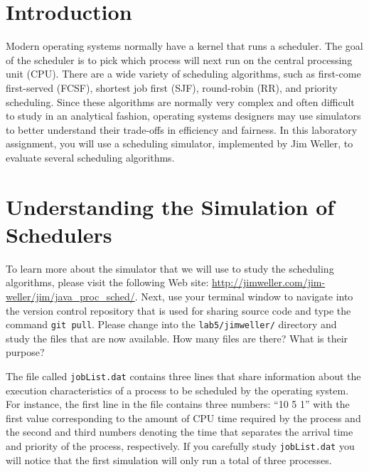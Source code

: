 


\usepackage[compact]{titlesec}


\section*{Introduction}

  Modern operating systems normally have a kernel that runs a scheduler.  The goal of the scheduler is to pick which
  process will next run on the central processing unit (CPU).  There are a wide variety of scheduling algorithms, such
  as first-come first-served (FCSF), shortest job first (SJF), round-robin (RR), and priority scheduling.  Since these
  algorithms are normally very complex and often difficult to study in an analytical fashion, operating systems
  designers may use simulators to better understand their trade-offs in efficiency and fairness. In this laboratory
  assignment, you will use a scheduling simulator, implemented by Jim Weller, to evaluate several scheduling algorithms.

\section*{Understanding the Simulation of Schedulers}

  To learn more about the simulator that we will use to study the scheduling algorithms, please visit the following Web
  site: \url{http://jimweller.com/jim-weller/jim/java_proc_sched/}. Next, use your terminal window to navigate into the
  version control repository that is used for sharing source code and type the command {\tt git pull}.  Please change
  into the {\tt lab5/jimweller/} directory and study the files that are now available. How many files are there? What is
  their purpose?

  The file called {\tt jobList.dat} contains three lines that share information about the execution characteristics of a
  process to be scheduled by the operating system.  For instance, the first line in the file contains three numbers: ``10
  5 1'' with the first value corresponding to the amount of CPU time required by the process and the second and third
  numbers denoting the time that separates the arrival time and priority of the process, respectively. If you carefully
  study {\tt jobList.dat} you will notice that the first simulation will only run a total of three processes.

